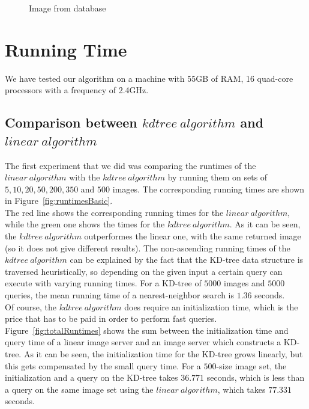 \begin{figure}[ht!]
\begin{minipage}{.3\textwidth}
	\caption{Image from database}
\end{minipage}
\end{figure}

\section{Running Time}
We have tested our algorithm on a machine with 55GB of RAM, 16 quad-core processors with a frequency of 2.4GHz.\\

\subsection{Comparison between $kdtree\ algorithm$ and $linear\ algorithm$}
The first experiment that we did was comparing the runtimes of the $linear\ algorithm$ with the $kdtree\ algorithm$ by running them on sets of $5, 10, 20, 50, 200, 350$ and $500$ images. The corresponding running times are shown in Figure~\ref{fig:runtimesBasic}.\\
The red line shows the corresponding running times for the $linear\ algorithm$, while the green one shows the times for the $kdtree\ algorithm$. As it can be seen, the $kdtree\ algorithm$ outperformes the linear one, with the same returned image (so it does not give different results). The non-ascending running times of the $kdtree\ algorithm$ can be explained by the fact that the KD-tree data structure is traversed heuristically, so depending on the given input a certain query can execute with varying running times. For a KD-tree of $5000$ images and $5000$ queries, the mean running time of a nearest-neighbor search is $1.36$ seconds.\\
Of course, the $kdtree\ algorithm$ does require an initialization time, which is the price that has to be paid in order to perform fast queries. Figure~\ref{fig:totalRuntimes} shows the sum between the initialization time and query time of a linear image server and an image server which constructs a KD-tree. As it can be seen, the initialization time for the KD-tree grows linearly, but this gets compensated by the small query time. For a $500$-size image set, the initialization and a query on the KD-tree takes $36.771$ seconds, which is less than a query on the same image set using the $linear\ algorithm$, which takes $77.331$ seconds.

